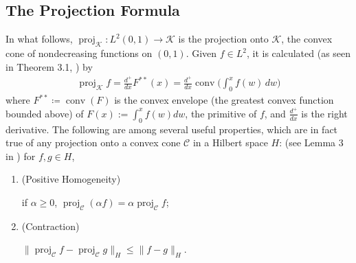 \documentclass[11pt]{article}
\numberwithin{equation}{section}
\DeclareMathOperator{\proj}{proj}
\DeclareMathOperator{\conv}{conv}
\begin{document}
\subsection{The Projection Formula}\label{projection-section}
    In what follows, $\proj_{\mathcal K}:L^2(0,1)\to \mathcal{K}$ is the projection onto $\mathcal{K}$, the convex cone of nondecreasing functions on $(0,1)$. Given $f\in L^2$, it is calculated (as seen in Theorem 3.1, \cite{Natile-Savare}) by 
    \begin{align}\label{projection-computation}
        \proj_\mathcal{K}f=\frac{d^+}{dx}F^{**}(x)=\frac{d^+}{dx}\conv\Big(\int_0^x f(w) \, dw\Big)
    \end{align}
    where $F^{**}\coloneq\conv(F)$ is the convex envelope (the greatest convex function bounded above) of $F(x):=\int_0^x f(w)dw$, the primitive of $f$, and $\frac{d^+}{dx}$ is the right derivative. The following are among several useful properties, which are in fact true of any projection onto a convex cone $\mathcal{C}$ in a Hilbert space $H$: (see Lemma 3 in \cite{Ingram-Marsh}) for $f,g\in H$, 
    \begin{enumerate}[label=\textup{(\roman*)}]
        \item \hypertarget{PositiveHomogeneity}{\textup{(Positive Homogeneity)}} if $\alpha\geq0$, $\proj_\mathcal{C}(\alpha f)=\alpha\proj_\mathcal{C}f$;
        \item \hypertarget{Contraction}{\textup{(Contraction)}} $\|\proj_\mathcal{C}f-\proj_\mathcal{C}g\|_H\leq\|f-g\|_H$.
    \end{enumerate}
    
\end{document}
